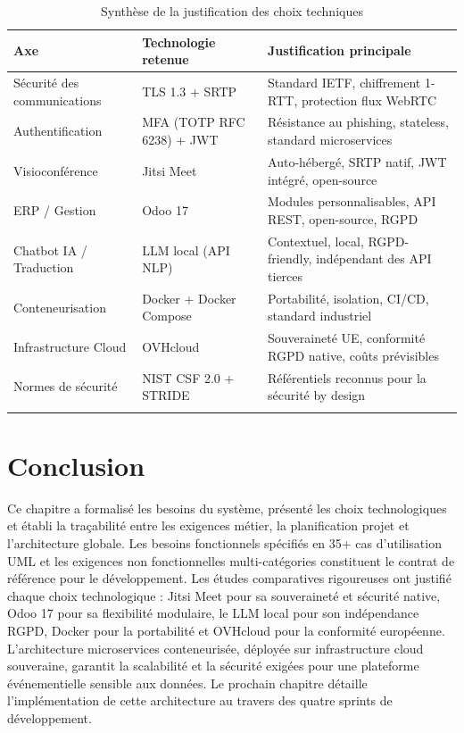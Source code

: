 \begin{longtable}{|m{3.5cm}|m{3.5cm}|m{6cm}|}
\hline
\textbf{Axe} & \textbf{Technologie retenue} & \textbf{Justification principale} \\
\hline
\endhead
\endfoot
\endlastfoot
\hline
Sécurité des communications & TLS 1.3 + SRTP & Standard IETF, chiffrement 1-RTT, protection flux WebRTC \\
\hline
Authentification & MFA (TOTP RFC 6238) + JWT & Résistance au phishing, stateless, standard microservices \\
\hline
Visioconférence & Jitsi Meet & Auto-hébergé, SRTP natif, JWT intégré, open-source \\
\hline
ERP / Gestion & Odoo 17 & Modules personnalisables, API REST, open-source, RGPD \\
\hline
Chatbot IA / Traduction & LLM local (API NLP) & Contextuel, local, RGPD-friendly, indépendant des API tierces \cite{whisper} \\
\hline
Conteneurisation & Docker + Docker Compose & Portabilité, isolation, CI/CD, standard industriel \cite{docker} \\
\hline
Infrastructure Cloud & OVHcloud & Souveraineté UE, conformité RGPD native, coûts prévisibles \\
\hline
Normes de sécurité & NIST CSF 2.0 + STRIDE & Référentiels reconnus pour la sécurité by design \cite{nist}\cite{stride} \\
\hline
\captionsetup{justification=centering,margin=2cm}
\caption{Synthèse de la justification des choix techniques}
\label{tab:justification}
\end{longtable}

\section*{Conclusion}
Ce chapitre a formalisé les besoins du système, présenté les choix technologiques et établi la traçabilité entre les exigences métier, la planification projet et l'architecture globale. Les besoins fonctionnels spécifiés en 35+ cas d'utilisation UML et les exigences non fonctionnelles multi-catégories constituent le contrat de référence pour le développement. Les études comparatives rigoureuses ont justifié chaque choix technologique : Jitsi Meet pour sa souveraineté et sécurité native, Odoo 17 pour sa flexibilité modulaire, le LLM local pour son indépendance RGPD, Docker pour la portabilité et OVHcloud pour la conformité européenne. L'architecture microservices conteneurisée, déployée sur infrastructure cloud souveraine, garantit la scalabilité et la sécurité exigées pour une plateforme événementielle sensible aux données. Le prochain chapitre détaille l'implémentation de cette architecture au travers des quatre sprints de développement.
